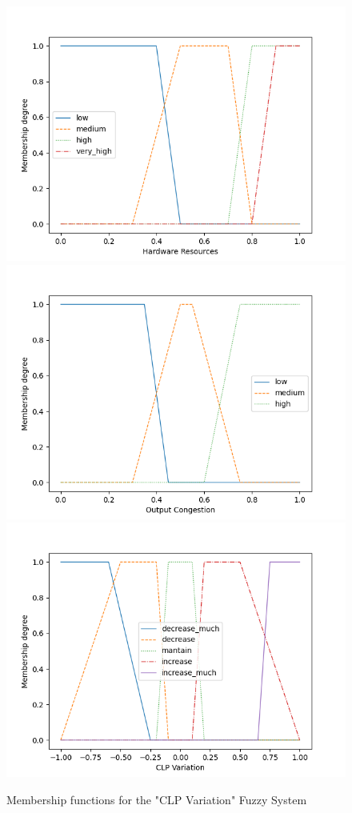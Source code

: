 \begin{figure}[!htb]
    \centering
    \hspace*{-1cm}
    
    \includegraphics[width=.33\textwidth]{images/plots/CpuMem.png}\hfill
    \includegraphics[width=.33\textwidth]{images/plots/OutCongestion.png}\hfill
    \includegraphics[width=.33\textwidth]{images/plots/CLP.png}
    
    \hspace*{-1cm}
    \caption{Membership functions for the "CLP Variation" Fuzzy System}
    \label{fig:FS_CLP_FSETS}
\end{figure}


